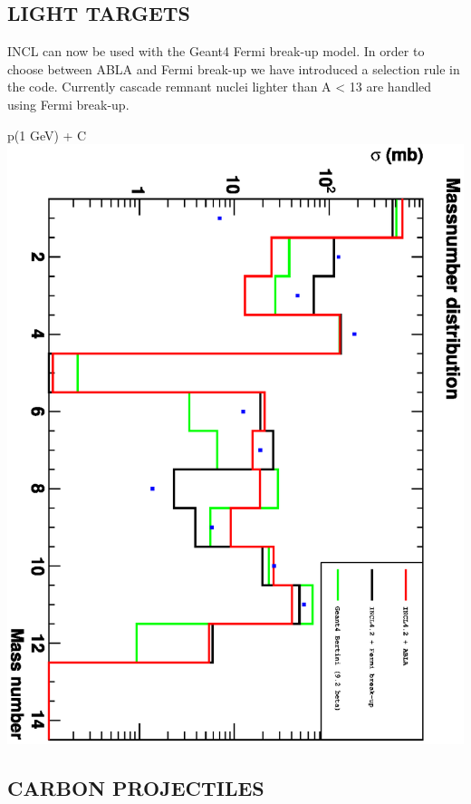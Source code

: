 \documentclass[20pt]{article}
\newenvironment{textbox}
{\begin{lrbox}{\dummybox}\begin{minipage}{0.9\columnwidth}}
{\end{minipage}\end{lrbox}\raisebox{-\depth}{\psshadowbox[framesep=1em,framearc=.1,shadow=true]{\usebox{\dummybox}}}\vspace{0.005\textheight}}
\begin{document}
\begin{center}
\begin{multicols}{3}
\begin{textbox}
\section*{{\Huge {\sf LIGHT TARGETS}}}
{\color{udsect}

{\sf INCL} can now be used with the {\sf Geant4} Fermi break-up
model. In order to choose between ABLA and Fermi break-up we have
introduced a selection rule in the code. Currently cascade remnant
nuclei lighter than A < 13 are handled using Fermi break-up.

\begin{center}
{\Huge {\sf p(1 GeV) + C}}
\includegraphics[scale=0.6,angle=90]{images/masses.eps}
\end{center}
}
\end{textbox}

\begin{textbox}
\section*{{\Huge {\sf CARBON PROJECTILES}}}
{\color{udsect}

}
\end{textbox}
\end{multicols}
\end{center}
\end{document}

